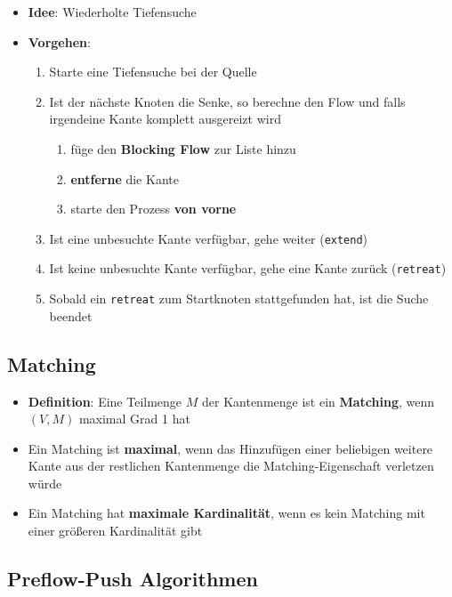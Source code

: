 \documentclass[10pt,a4paper]{article}
\begin{document}
	\begin{itemize}
		\item \textbf{Idee}: Wiederholte Tiefensuche
		\item \textbf{Vorgehen}:
		\begin{enumerate}
			\item Starte eine Tiefensuche bei der Quelle
			\item Ist der nächste Knoten die Senke, so berechne den Flow und falls irgendeine Kante komplett ausgereizt wird
			\begin{enumerate}
				\item füge den \textbf{Blocking Flow} zur Liste hinzu
				\item \textbf{entferne} die Kante
				\item starte den Prozess \textbf{von vorne}
			\end{enumerate}
			\item Ist eine unbesuchte Kante verfügbar, gehe weiter (\texttt{extend})
			\item Ist keine unbesuchte Kante verfügbar, gehe eine Kante zurück (\texttt{retreat})
			\item Sobald ein \texttt{retreat} zum Startknoten stattgefunden hat, ist die Suche beendet
		\end{enumerate}
	\end{itemize}

	\subsection{Matching}
	\label{mfm:sub:matching}

	\begin{itemize}
		\item \textbf{Definition}: Eine Teilmenge $M$ der Kantenmenge ist ein \textbf{Matching}, wenn $(V, M)$ maximal Grad 1 hat
		\item Ein Matching ist \textbf{maximal}, wenn das Hinzufügen einer beliebigen weitere Kante aus der restlichen Kantenmenge die Matching-Eigenschaft verletzen würde
		\item Ein Matching hat \textbf{maximale Kardinalität}, wenn es kein Matching mit einer größeren Kardinalität gibt
	\end{itemize}

	\newpage
	\subsection{Preflow-Push Algorithmen}
	\label{mfm:sub:preflow_push_algorithmen}
	
\end{document}
